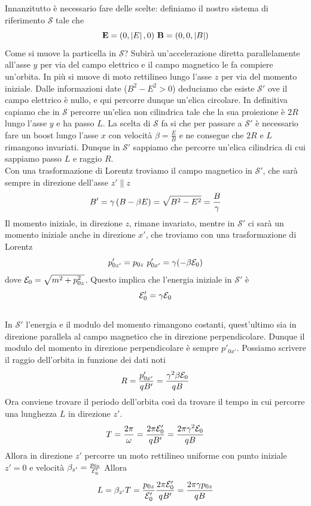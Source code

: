 \documentclass[12pt,twoside,a4]{article}
\begin{document}
\begin{solution}
	Innanzitutto è necessario fare delle scelte: definiamo il nostro sistema di riferimento $\mathcal{S}$ tale che 
$$ \textbf{E} = (0, \left| {E} \right|, 0)  \  \textbf{B} = (0, 0, \left| {B} \right|)$$
Come si muove la particella in $\mathcal{S}$? Subirà  un'accelerazione diretta parallelamente all'asse $y$ per via del campo elettrico e il campo magnetico le fa compiere un'orbita. In più si muove di moto rettilineo lungo l'asse $z$ per via del momento iniziale. Dalle informazioni date ($B^2 - E^2 >0$) deduciamo che esiste $\mathcal{S}'$ ove il campo elettrico è nullo, e qui percorre dunque un'elica circolare. In definitiva capiamo che in $\mathcal{S}$ percorre un'elica non cilindrica tale che la sua proiezione è $2R$ lungo l'asse $y$ e ha passo $L$. La scelta di $\mathcal{S}$ fa si che per passare a $\mathcal{S}'$ è necessario fare un boost lungo l'asse $x$ con velocità  $\beta = \frac{E}{B}$ e ne consegue che $2R$ e $L$ rimangono invariati. Dunque in $\mathcal{S}'$ sappiamo che percorre un'elica cilindrica di cui sappiamo passo $L$ e raggio $R$. 
\\
Con una trasformazione di Lorentz troviamo il campo magnetico in $\mathcal{S}'$, che sarà  sempre in direzione dell'asse $z' \parallel z$
$$ B' = \gamma \left({B - \beta E}\right) = \sqrt{B^2- E^2} = \frac{B}{\gamma}$$
Il momento iniziale, in direzione $z$, rimane invariato, mentre in $\mathcal{S}'$ ci sarà  un momento iniziale anche in direzione $x'$, che troviamo con una trasformazione di Lorentz
$$ p'_{0z'} = p_{0z}  \  p'_{0x'} = \gamma ( - \beta \mathcal{E}_0) $$
dove $\mathcal{E}_0  = \sqrt{m^2 + p_{0z}^2}$. Questo implica che l'energia iniziale in $\mathcal{S}'$ è
$$ \mathcal{E}'_0 = \gamma \mathcal{E}_0$$
\\
In $\mathcal{S}'$ l'energia e il modulo del momento rimangono costanti, quest'ultimo sia in direzione parallela al campo magnetico che in direzione perpendicolare. Dunque il modulo del momento in direzione perpendicolare è sempre $p'_{0x'}$. Possiamo scrivere il raggio dell'orbita in funzione dei dati noti
$$ R = \frac{p'_{0x'}}{q B'} = \frac{\gamma^2 \beta \mathcal{E}_0}{q B} $$
Ora conviene trovare il periodo dell'orbita così da trovare il tempo in cui percorre una lunghezza $L$ in direzione $z'$. 
$$ T = \frac{2 \pi}{\omega} = \frac{2 \pi \mathcal{E}'_0}{q  B'} = \frac{2 \pi \gamma^2 \mathcal{E}_0}{q  B} $$
Allora in direzione $z'$ percorre un moto rettilineo uniforme con punto iniziale $z'=0$ e velocità  $\beta_{z'} = \frac{ p_{0z}}{\mathcal{E}'_0}$ Allora
$$ L =  \beta_{z'} T =  \frac{p_{0z}}{\mathcal{E}'_0} \frac{2 \pi \mathcal{E}'_0}{q  B'}
= \frac{2 \pi \gamma p_{0z}}{q B} $$

\end{solution}
\end{document}
